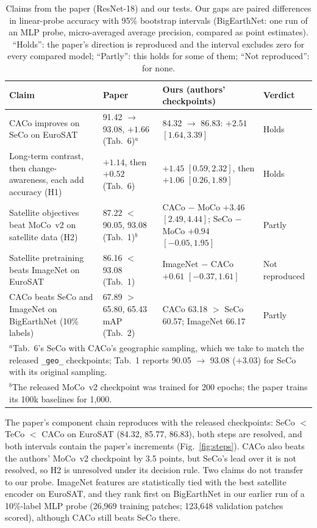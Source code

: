 \documentclass[conference]{IEEEtran}
\begin{document}
\begin{table}[t]
\centering
\caption{Claims from the paper (ResNet-18) and our tests. Our gaps are paired
differences in linear-probe accuracy with 95\% bootstrap intervals (BigEarthNet:
one run of an MLP probe, micro-averaged average precision, compared as point
estimates). ``Holds'': the paper's direction is reproduced and the interval
excludes zero for every compared model; ``Partly'': this holds for some of them;
``Not reproduced'': for none.}
\label{tab:claims}
\begin{tabular}{p{4.4cm}p{3.9cm}p{6.1cm}l}
\toprule
Claim & Paper & Ours (authors' checkpoints) & Verdict \\
\midrule
CACo improves on SeCo on EuroSAT & 91.42 $\rightarrow$ 93.08, $+1.66$ (Tab.~6)$^a$ & 84.32 $\rightarrow$ 86.83: $+2.51$ $[1.64, 3.39]$ & Holds \\
Long-term contrast, then change-awareness, each add accuracy (H1) & $+1.14$, then $+0.52$ (Tab.~6) & $+1.45$ $[0.59, 2.32]$, then $+1.06$ $[0.26, 1.89]$ & Holds \\
Satellite objectives beat MoCo~v2 on satellite data (H2) & 87.22 $<$ 90.05, 93.08 (Tab.~1)$^b$ & CACo $-$ MoCo $+3.46$ $[2.49, 4.44]$; SeCo $-$ MoCo $+0.94$ $[-0.05, 1.95]$ & Partly \\
Satellite pretraining beats ImageNet on EuroSAT & 86.16 $<$ 93.08 (Tab.~1) & ImageNet $-$ CACo $+0.61$ $[-0.37, 1.61]$ & Not reproduced \\
CACo beats SeCo and ImageNet on BigEarthNet (10\% labels) & 67.89 $>$ 65.80, 65.43 mAP (Tab.~2) & CACo 63.18 $>$ SeCo 60.57; ImageNet 66.17 & Partly \\
\bottomrule
\multicolumn{4}{p{0.95\textwidth}}{\footnotesize $^a$Tab.~6's SeCo with CACo's geographic sampling, which we take to match the released \texttt{\_geo\_} checkpoints; Tab.~1 reports 90.05 $\rightarrow$ 93.08 ($+3.03$) for SeCo with its original sampling.} \\
\multicolumn{4}{p{0.95\textwidth}}{\footnotesize $^b$The released MoCo~v2 checkpoint was trained for 200 epochs; the paper trains its 100k baselines for 1,000.} \\
\end{tabular}
\end{table}

The paper's component chain reproduces with the released checkpoints: SeCo
$<$ TeCo $<$ CACo on EuroSAT (84.32, 85.77, 86.83), both steps are resolved, and
both intervals contain the paper's increments (Fig.~\ref{fig:steps}). CACo also
beats the authors' MoCo~v2 checkpoint by 3.5 points, but SeCo's lead over it is
not resolved, so H2 is unresolved under its decision rule. Two claims do not
transfer to our probe. ImageNet features are statistically tied with the best
satellite encoder on EuroSAT, and they rank first on BigEarthNet in our earlier
run of a 10\%-label MLP probe (26,969 training patches; 123,648 validation patches
scored), although CACo still beats SeCo there.
\end{document}
